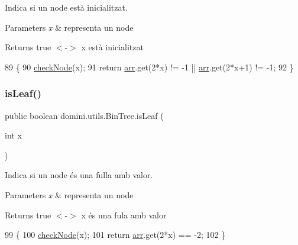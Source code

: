 Indica si un node està inicialitzat. 


\begin{DoxyParams}{Parameters}
{\em x} & representa un node \\
\hline
\end{DoxyParams}
\begin{DoxyReturn}{Returns}
true $<$-\/$>$ x està inicialitzat 
\end{DoxyReturn}

\begin{DoxyCode}
89                                  \{
90         \hyperlink{classdomini_1_1utils_1_1BinTree_a32b3e2ad7dfee3425e0b1f6f8b5100f5}{checkNode}(x);
91         \textcolor{keywordflow}{return} \hyperlink{classdomini_1_1utils_1_1BinTree_a357bcbcf07ba7fcb99d11b237d189e65}{arr}.get(2*x) != -1 || \hyperlink{classdomini_1_1utils_1_1BinTree_a357bcbcf07ba7fcb99d11b237d189e65}{arr}.get(2*x+1) != -1;
92     \}
\end{DoxyCode}
\mbox{\label{classdomini_1_1utils_1_1BinTree_a37030e961f5613a5c74984ac002d965b}} 
\subsubsection{\texorpdfstring{is\+Leaf()}{isLeaf()}}
{\footnotesize\ttfamily public boolean domini.\+utils.\+Bin\+Tree.\+is\+Leaf (\begin{DoxyParamCaption}\item[{int}]{x }\end{DoxyParamCaption})\hspace{0.3cm}{\ttfamily [inline]}}



Indica si un node és una fulla amb valor. 


\begin{DoxyParams}{Parameters}
{\em x} & representa un node \\
\hline
\end{DoxyParams}
\begin{DoxyReturn}{Returns}
true $<$-\/$>$ x és una fula amb valor 
\end{DoxyReturn}

\begin{DoxyCode}
99                                  \{
100         \hyperlink{classdomini_1_1utils_1_1BinTree_a32b3e2ad7dfee3425e0b1f6f8b5100f5}{checkNode}(x);
101         \textcolor{keywordflow}{return} \hyperlink{classdomini_1_1utils_1_1BinTree_a357bcbcf07ba7fcb99d11b237d189e65}{arr}.get(2*x) == -2;
102     \}
\end{DoxyCode}
\mbox{\label{classdomini_1_1utils_1_1BinTree_a47c913594a3116b2e602c87fa4afc5c3}} 
